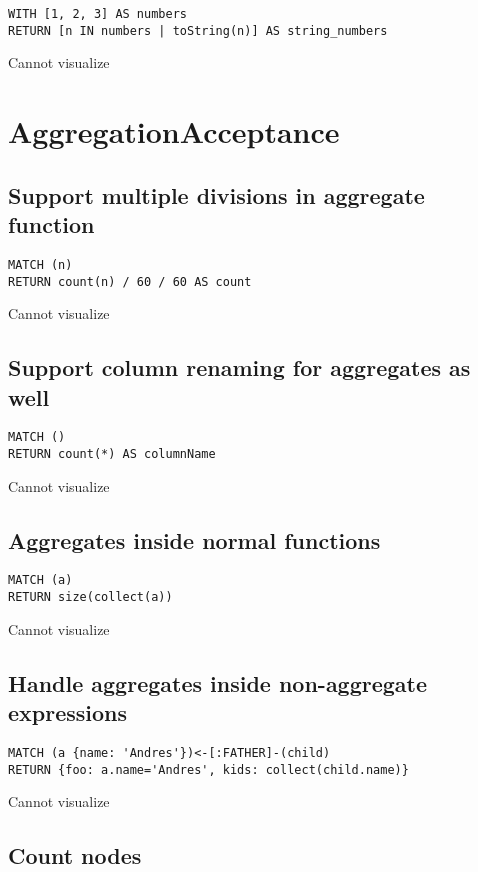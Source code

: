 \begin{lstlisting}
WITH [1, 2, 3] AS numbers
RETURN [n IN numbers | toString(n)] AS string_numbers
\end{lstlisting}

Cannot visualize
\section{AggregationAcceptance}

\subsection{Support multiple divisions in aggregate function}

\begin{lstlisting}
MATCH (n)
RETURN count(n) / 60 / 60 AS count
\end{lstlisting}

Cannot visualize
\subsection{Support column renaming for aggregates as well}

\begin{lstlisting}
MATCH ()
RETURN count(*) AS columnName
\end{lstlisting}

Cannot visualize
\subsection{Aggregates inside normal functions}

\begin{lstlisting}
MATCH (a)
RETURN size(collect(a))
\end{lstlisting}

Cannot visualize
\subsection{Handle aggregates inside non-aggregate expressions}

\begin{lstlisting}
MATCH (a {name: 'Andres'})<-[:FATHER]-(child)
RETURN {foo: a.name='Andres', kids: collect(child.name)}
\end{lstlisting}

Cannot visualize
\subsection{Count nodes}

